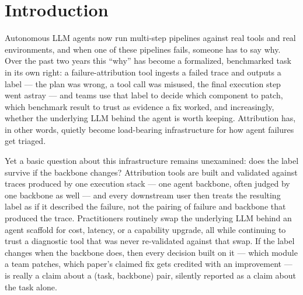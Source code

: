 \documentclass[11pt]{article}
\begin{document}
\section{Introduction}

Autonomous LLM agents now run multi-step pipelines against real tools and real environments, and when one of these pipelines fails, someone has to say why. Over the past two years this ``why'' has become a formalized, benchmarked task in its own right: a failure-attribution tool ingests a failed trace and outputs a label --- the plan was wrong, a tool call was misused, the final execution step went astray --- and teams use that label to decide which component to patch, which benchmark result to trust as evidence a fix worked, and increasingly, whether the underlying LLM behind the agent is worth keeping. Attribution has, in other words, quietly become load-bearing infrastructure for how agent failures get triaged.

Yet a basic question about this infrastructure remains unexamined: does the label survive if the backbone changes? Attribution tools are built and validated against traces produced by one execution stack --- one agent backbone, often judged by one backbone as well --- and every downstream user then treats the resulting label as if it described the failure, not the pairing of failure and backbone that produced the trace. Practitioners routinely swap the underlying LLM behind an agent scaffold for cost, latency, or a capability upgrade, all while continuing to trust a diagnostic tool that was never re-validated against that swap. If the label changes when the backbone does, then every decision built on it --- which module a team patches, which paper's claimed fix gets credited with an improvement --- is really a claim about a (task, backbone) pair, silently reported as a claim about the task alone.
\end{document}
